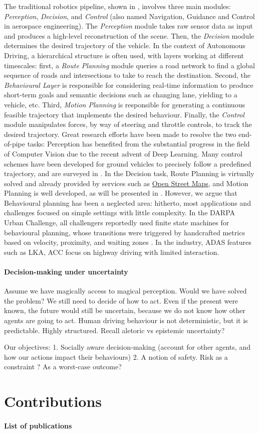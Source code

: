 The traditional robotics pipeline, shown in , involves three main modules: \emph{Perception}, \emph{Decision}, and \emph{Control} (also named Navigation, Guidance and Control in aerospace engineering). The \emph{Perception} module takes raw sensor data as input and produces a high-level reconstruction of the scene. Then, the \emph{Decision} module determines the desired trajectory of the vehicle. In the context of Autonomous Driving, a hierarchical structure is often used, with layers working at different timescales: first, a \emph{Route Planning} module queries a road network to find a global sequence of roads and intersections to take to reach the destination. Second, the \emph{Behavioural Layer} is responsible for considering real-time information to produce short-term goals and semantic decisions such as changing lane, yielding to a vehicle, etc. Third, \emph{Motion Planning} is responsible for generating a continuous feasible trajectory that implements the desired behaviour. Finally, the \emph{Control} module manipulates forces, by way of steering and throttle controls, to track the desired trajectory. Great research efforts have been made to resolve the two end-of-pipe tasks: Perception has benefited from the substantial progress in the field of Computer Vision due to the recent advent of Deep Learning. Many control schemes have been developed for ground vehicles to precisely follow a predefined trajectory, and are surveyed in \citep{Polack2018}.
In the Decision task, Route Planning is virtually solved and already provided by services such as \href{https://wiki.openstreetmap.org/wiki/Routing}{Open Street Maps}, and Motion Planning is well developed, as will be presented in . However, we argue that Behavioural planning has been a neglected area: hitherto, most applications and challenges focused on simple settings with little complexity. In the DARPA Urban Challenge, all challengers reportedly used finite state machines for behavioural planning, whose transitions were triggered by handcrafted metrics based on velocity, proximity, and waiting zones \citep{Buehler2009}. 
In the industry, ADAS features such as LKA, ACC focus on highway driving with limited interaction. 


\paragraph{Decision-making under uncertainty}

Assume we have magically access to magical perception. Would we have solved the problem?
We still need to decide of how to act. Even if the present were known, the future would still be uncertain, because we do not know how other agents are going to act.
Human driving behaviour is not deterministic, but it is predictable. Highly structured.
Recall aletoric vs epistemic uncertainty?

Our objectives: 
1. Socially aware decision-making (account for other agents, and how our actions impact their behaviours)
2. A notion of safety. Risk as a constraint ? As a worst-case outcome?

\section{Contributions}

\paragraph{List of publications}